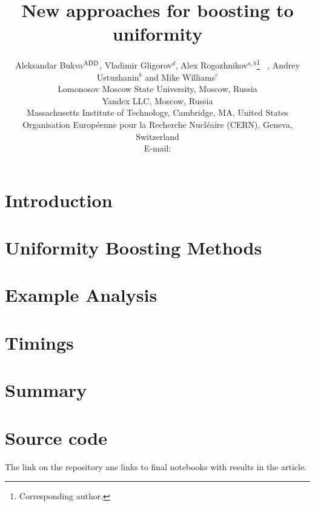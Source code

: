 \documentclass{JINST}
\title{New approaches for boosting to uniformity}
\author{
Aleksandar Bukva$^{\rm ADD}$, 
Vladimir Gligorov$^d$,
Alex Rogozhnikov$^{a,b}$\thanks{Corresponding author.}~ ,
Andrey Ustuzhanin$^b$ and
Mike Williams$^c$\\
\llap{$^a$}Lomonosov Moscow State University, Moscow, Russia\\
\llap{$^b$}Yandex LLC, Moscow, Russia\\
\llap{$^c$}Massachusetts Institute of Technology, Cambridge, MA, United States \\
\llap{$^d$}Organisation Europ\'eenne pour la Recherche Nucl\'eaire (CERN), Geneva, Switzerland  \\
E-mail: \email{alex.rogozhnikov@yandex.ru}}
\theoremstyle{definition}
\theoremstyle{remark}
\begin{document}
\maketitle


\section{Introduction}



%
%

\section{Uniformity Boosting Methods}


\section{Example Analysis}




\section{Timings}



\section{Summary}



\section{Source code}


The link on the repository ans links to final notebooks with results in the article.

\acknowledgments
\end{document}
